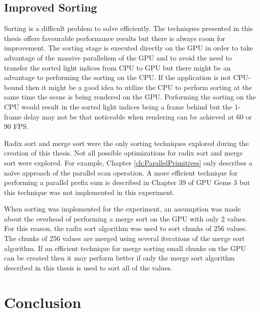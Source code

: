
\subsection{Improved Sorting}

Sorting is a difficult problem to solve efficiently. The techniques presented in this thesis offers favourable performance results but there is always room for improvement. The sorting stage is executed directly on the GPU in order to take advantage of the massive parallelism of the GPU and to avoid the need to transfer the sorted light indices from CPU to GPU but there might be an advantage to performing the sorting on the CPU. If the application is not CPU-bound then it might be a good idea to utilize the CPU to perform sorting at the same time the scene is being rendered on the GPU. Performing the sorting on the CPU would result in the sorted light indices being a frame behind but the 1-frame delay may not be that noticeable when rendering can be achieved at 60 or 90 FPS.

Radix sort and merge sort were the only sorting techniques explored during the creation of this thesis. Not all possible optimizations for radix sort and merge sort were explored. For example, Chapter \ref{ch:ParallelPrimitives} only describes a naïve approach of the parallel scan operation. A more efficient technique for performing a parallel prefix sum is described in Chapter 39 of GPU Gems 3 \parencite{34_harris_sengupta_owens_2008} but this technique was not implemented in this experiment.

When sorting was implemented for the experiment, an assumption was made about the overhead of performing a merge sort on the GPU with only 2 values. For this reason, the radix sort algorithm was used to sort chunks of 256 values. The chunks of 256 values are merged using several iterations of the merge sort algorithm. If an efficient technique for merge sorting small chunks on the GPU can be created then it may perform better if only the merge sort algorithm described in this thesis is used to sort all of the values.

\section{Conclusion}

